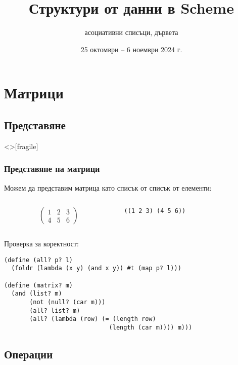 \documentclass[alsotrans,beameroptions={aspectratio=169}]{beamerswitch}
\title{Структури от данни в Scheme}
\subtitle{\ifbool{matrices}{матрици, }асоциативни списъци, дървета\ifbool{deeplists}{, дълбоки списъци}{}\ifbool{graphs}{, графи}{}}
\date[25.10–6.11.2024 г.]{25 октомври – 6 ноември 2024 г.}
\begin{document}
\begin{frame}
  \titlepage
\end{frame}

\section{Матрици}

\subsection{Представяне}

\begin{frame}<>[fragile]
  \frametitle{Представяне на матрици}
  Можем да представим матрица като списък от списък от елементи:\\
  \begin{columns}[T,onlytextwidth]
    \begin{column}{0.5\textwidth}
      \begin{equation*}
        \left(
          \begin{array}{ccc}
            1 & 2 & 3\\
            4 & 5 & 6
          \end{array}
        \right)
      \end{equation*}
    \end{column}
    \begin{column}{0.5\textwidth}
      \vspace{2ex}
      \tt{((1 2 3) (4 5 6))}
    \end{column}
  \end{columns}
  \vspace{2ex}
  \pause
  Проверка за коректност:
  \pause
\begin{lstlisting}
(define (all? p? l)
  (foldr (lambda (x y) (and x y)) #t (map p? l)))

(define (matrix? m)
  (and (list? m)
       (not (null? (car m)))
       (all? list? m)
       (all? (lambda (row) (= (length row)
                             (length (car m)))) m)))
\end{lstlisting}
\end{frame}

\subsection{Операции}
\end{document}
